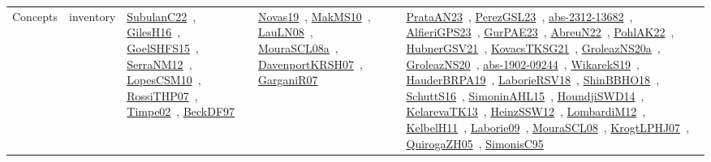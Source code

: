 {\begin{longtable}{lp{3cm}>{\raggedright\arraybackslash}p{6cm}>{\raggedright\arraybackslash}p{6cm}>{\raggedright\arraybackslash}p{8cm}}
Concepts & inventory & \href{articles/SubulanC22.pdf}{SubulanC22}~\cite{SubulanC22}, \href{papers/GilesH16.pdf}{GilesH16}~\cite{GilesH16}, \href{articles/GoelSHFS15.pdf}{GoelSHFS15}~\cite{GoelSHFS15}, \href{papers/SerraNM12.pdf}{SerraNM12}~\cite{SerraNM12}, \href{articles/LopesCSM10.pdf}{LopesCSM10}~\cite{LopesCSM10}, \href{papers/RossiTHP07.pdf}{RossiTHP07}~\cite{RossiTHP07}, \href{articles/Timpe02.pdf}{Timpe02}~\cite{Timpe02}, \href{papers/BeckDF97.pdf}{BeckDF97}~\cite{BeckDF97} & \href{articles/Novas19.pdf}{Novas19}~\cite{Novas19}, \href{papers/MakMS10.pdf}{MakMS10}~\cite{MakMS10}, \href{papers/LauLN08.pdf}{LauLN08}~\cite{LauLN08}, \href{papers/MouraSCL08a.pdf}{MouraSCL08a}~\cite{MouraSCL08a}, \href{papers/DavenportKRSH07.pdf}{DavenportKRSH07}~\cite{DavenportKRSH07}, \href{papers/GarganiR07.pdf}{GarganiR07}~\cite{GarganiR07} & \href{articles/PrataAN23.pdf}{PrataAN23}~\cite{PrataAN23}, \href{papers/PerezGSL23.pdf}{PerezGSL23}~\cite{PerezGSL23}, \href{articles/abs-2312-13682.pdf}{abs-2312-13682}~\cite{abs-2312-13682}, \href{articles/AlfieriGPS23.pdf}{AlfieriGPS23}~\cite{AlfieriGPS23}, \href{articles/GurPAE23.pdf}{GurPAE23}~\cite{GurPAE23}, \href{articles/AbreuN22.pdf}{AbreuN22}~\cite{AbreuN22}, \href{articles/PohlAK22.pdf}{PohlAK22}~\cite{PohlAK22}, \href{articles/HubnerGSV21.pdf}{HubnerGSV21}~\cite{HubnerGSV21}, \href{papers/KovacsTKSG21.pdf}{KovacsTKSG21}~\cite{KovacsTKSG21}, \href{papers/GroleazNS20a.pdf}{GroleazNS20a}~\cite{GroleazNS20a}, \href{papers/GroleazNS20.pdf}{GroleazNS20}~\cite{GroleazNS20}, \href{articles/abs-1902-09244.pdf}{abs-1902-09244}~\cite{abs-1902-09244}, \href{articles/WikarekS19.pdf}{WikarekS19}~\cite{WikarekS19}, \href{articles/HauderBRPA19.pdf}{HauderBRPA19}~\cite{HauderBRPA19}, \href{articles/LaborieRSV18.pdf}{LaborieRSV18}~\cite{LaborieRSV18}, \href{articles/ShinBBHO18.pdf}{ShinBBHO18}~\cite{ShinBBHO18}, \href{papers/SchuttS16.pdf}{SchuttS16}~\cite{SchuttS16}, \href{articles/SimoninAHL15.pdf}{SimoninAHL15}~\cite{SimoninAHL15}, \href{papers/HoundjiSWD14.pdf}{HoundjiSWD14}~\cite{HoundjiSWD14}, \href{papers/KelarevaTK13.pdf}{KelarevaTK13}~\cite{KelarevaTK13}, \href{articles/HeinzSSW12.pdf}{HeinzSSW12}~\cite{HeinzSSW12}, \href{articles/LombardiM12.pdf}{LombardiM12}~\cite{LombardiM12}, \href{articles/KelbelH11.pdf}{KelbelH11}~\cite{KelbelH11}, \href{papers/Laborie09.pdf}{Laborie09}~\cite{Laborie09}, \href{papers/MouraSCL08.pdf}{MouraSCL08}~\cite{MouraSCL08}, \href{papers/KrogtLPHJ07.pdf}{KrogtLPHJ07}~\cite{KrogtLPHJ07}, \href{papers/QuirogaZH05.pdf}{QuirogaZH05}~\cite{QuirogaZH05}, \href{papers/SimonisC95.pdf}{SimonisC95}~\cite{SimonisC95}\\

\end{longtable}}
